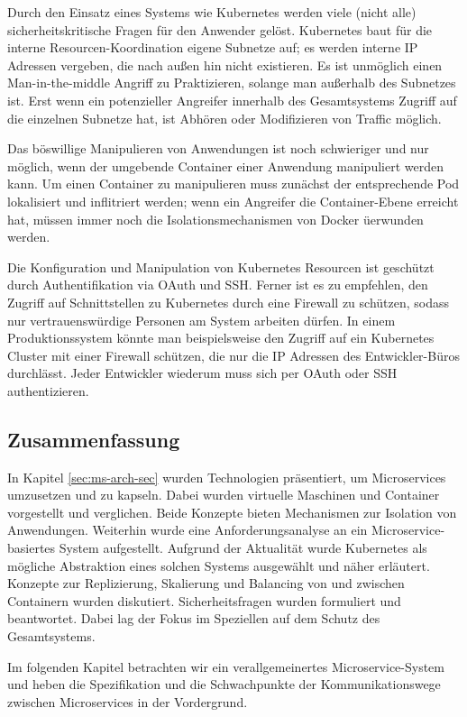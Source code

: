 Durch den Einsatz eines Systems wie Kubernetes werden viele (nicht alle) sicherheitskritische Fragen für den Anwender gelöst. Kubernetes baut für die interne Resourcen-Koordination eigene Subnetze auf; es werden interne IP Adressen vergeben, die nach außen hin nicht existieren. Es ist unmöglich einen Man-in-the-middle Angriff zu Praktizieren, solange man außerhalb des Subnetzes ist. Erst wenn ein potenzieller Angreifer innerhalb des Gesamtsystems Zugriff auf die einzelnen Subnetze hat, ist Abhören oder Modifizieren von Traffic möglich. 

Das böswillige Manipulieren von Anwendungen ist noch schwieriger und nur möglich, wenn der umgebende Container einer Anwendung manipuliert werden kann. Um einen Container zu manipulieren muss zunächst der entsprechende Pod lokalisiert und inflitriert werden; wenn ein Angreifer die Container-Ebene erreicht hat, müssen immer noch die Isolationsmechanismen von Docker üerwunden werden. 

Die Konfiguration und Manipulation von Kubernetes Resourcen ist geschützt durch Authentifikation via OAuth und SSH. Ferner ist es zu empfehlen, den Zugriff auf Schnittstellen zu Kubernetes durch eine Firewall zu schützen, sodass nur vertrauenswürdige Personen am System arbeiten dürfen. In einem Produktionssystem könnte man beispielsweise den Zugriff auf ein Kubernetes Cluster mit einer Firewall schützen, die nur die IP Adressen des Entwickler-Büros durchlässt. Jeder Entwickler wiederum muss sich per OAuth oder SSH authentizieren.

\subsection{Zusammenfassung}

In Kapitel \ref{sec:ms-arch-sec} wurden Technologien präsentiert, um Microservices umzusetzen und zu kapseln. Dabei wurden virtuelle Maschinen und Container vorgestellt und verglichen. Beide Konzepte bieten Mechanismen zur Isolation von Anwendungen. Weiterhin wurde eine Anforderungsanalyse an ein Microservice-basiertes System aufgestellt. Aufgrund der Aktualität wurde Kubernetes als mögliche Abstraktion eines solchen Systems ausgewählt und näher erläutert. Konzepte zur Replizierung, Skalierung und Balancing von und zwischen Containern wurden diskutiert. Sicherheitsfragen wurden formuliert und beantwortet. Dabei lag der Fokus im Speziellen auf dem Schutz des Gesamtsystems.

Im folgenden Kapitel betrachten wir ein verallgemeinertes Microservice-System und heben die Spezifikation und die Schwachpunkte der Kommunikationswege zwischen Microservices in der Vordergrund.  